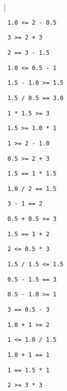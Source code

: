 \begin{exercise}
\begin{sltasks}[counter-format=2.tsk[1]]
  \begin{items}
    \item \texttt{ 1.0 <= 2 - 0.5 }
    \item \texttt{ 3 >= 2 + 3 }
    \item \texttt{ 2 == 3 - 1.5 }
    \item \texttt{ 1.0 <= 0.5 - 1 }
    \item \texttt{ 1.5 - 1.0 >= 1.5 }
  \end{items}
  \task
  \begin{items}
  \item \texttt{ 1.5 / 0.5 == 3.0 }
  \item \texttt{ 1 * 1.5 >= 3 }
  \item \texttt{ 1.5 >= 1.0 * 1 }
  \item \texttt{ 1 >= 2 - 1.0 }
  \item \texttt{ 0.5 >= 2 + 3 }
  \end{items}
  \task
  \begin{items}
  \item \texttt{ 1.5 == 1 * 1.5 }
  \item \texttt{ 1.0 / 2 == 1.5 }
  \item \texttt{ 3 - 1 == 2 }
  \item \texttt{ 0.5 + 0.5 >= 3 }
  \item \texttt{ 1.5 == 1 + 2 }
  \end{items}
  \task
  \begin{items}
  \item \texttt{ 2 <= 0.5 * 3 }
  \item \texttt{ 1.5 / 1.5 <= 1.5 }
  \item \texttt{ 0.5 - 1.5 == 3 }
  \item \texttt{ 0.5 - 1.0 >= 1 }
  \item \texttt{ 3 == 0.5 - 3 }
  \end{items}
  \task
  \begin{items}
  \item \texttt{ 1.0 + 1 >= 2 }
  \item \texttt{ 1 <= 1.0 / 1.5 }
  \item \texttt{ 1.0 + 1 == 1 }
  \item \texttt{ 1 == 1.5 * 1 }
  \item \texttt{ 2 >= 3 * 3 }
  \end{items}
\end{sltasks}
\end{exercise}

